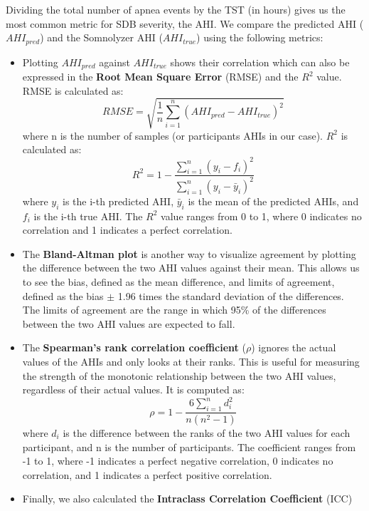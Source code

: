 Dividing the total number of apnea events by the TST (in hours) gives us the most common metric for SDB severity, the AHI. We compare the predicted AHI ($AHI_{pred}$) and the Somnolyzer AHI ($AHI_{true}$) using the following metrics:

\begin{itemize}
    \item Plotting $AHI_{pred}$ against $AHI_{true}$ shows their correlation which can also be expressed in the \textbf{Root Mean Square Error} (RMSE) and the \textbf{$R^2$} value. RMSE is calculated as:
    \begin{equation}
        RMSE = \sqrt{\frac{1}{n}\sum_{i=1}^{n}(AHI_{pred} - AHI_{true})^2} 
    \end{equation}
    where n is the number of samples (or participants AHIs in our case). $R^2$ is calculated as:
    \begin{equation}
        R^2 = 1 - \frac{\sum_{i=1}^{n}(y_i - f_i)^2}{\sum_{i=1}^{n}(y_i - \bar{y}_i)^2}
    \end{equation}
    where $y_i$ is the i-th predicted AHI, $\bar{y}_i$ is the mean of the predicted AHIs, and $f_i$ is the i-th true AHI. The $R^2$ value ranges from 0 to 1, where 0 indicates no correlation and 1 indicates a perfect correlation.
    \item The \textbf{Bland-Altman plot} is another way to visualize agreement by plotting the difference between the two AHI values against their mean. This allows us to see the bias, defined as the mean difference, and limits of agreement, defined as the bias $\pm$ 1.96 times the standard deviation of the differences. The limits of agreement are the range in which 95\% of the differences between the two AHI values are expected to fall.
    \item The \textbf{Spearman's rank correlation coefficient} ($\rho$) ignores the actual values of the AHIs and only looks at their ranks. This is useful for measuring the strength of the monotonic relationship between the two AHI values, regardless of their actual values. It is computed as:
    \begin{equation}
        \rho = 1 - \frac{6\sum_{i=1}^{n}d_i^2}{n(n^2-1)}
    \end{equation}
    where $d_i$ is the difference between the ranks of the two AHI values for each participant, and n is the number of participants.
    The coefficient ranges from -1 to 1, where -1 indicates a perfect negative correlation, 0 indicates no correlation, and 1 indicates a perfect positive correlation.
    \item Finally, we also calculated the \textbf{Intraclass Correlation Coefficient} (ICC) 
\end{itemize}

